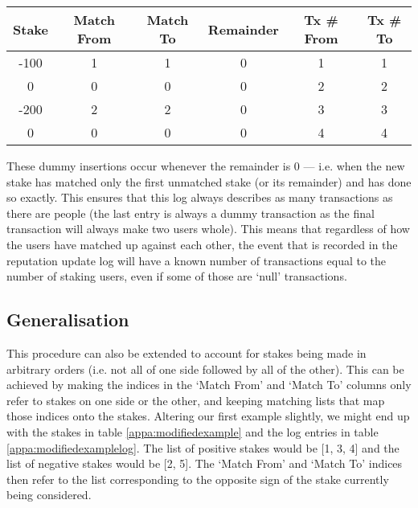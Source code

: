 \begin{table}[ht]
\centering
\caption{}
\begin{tabular}{|c|c|c|c|c|c|}
\hline
Stake & Match From & Match To & Remainder & Tx \# From & Tx \# To \\ \hline
-100  & 1          & 1        & 0   & 1 & 1     \\ \hline
 0 & 0          & 0        & 0      & 2 & 2   \\ \hline
-200 & 2          & 2        & 0    & 3 & 3    \\ \hline
 0 & 0          & 0        & 0      & 4 & 4   \\ \hline
\end{tabular}
\end{table}

These dummy insertions occur whenever the remainder is 0 --- i.e. when the new stake has matched only the first unmatched stake (or its remainder) and has done so exactly. This ensures that this log always describes as many transactions as there are people (the last entry is always a dummy transaction as the final transaction will always make two users whole). This means that regardless of how the users have matched up against each other, the event that is recorded in the reputation update log will have a known number of transactions equal to the number of staking users, even if some of those are `null' transactions.

\subsection{Generalisation}

This procedure can also be extended to account for stakes being made in arbitrary orders (i.e. not all of one side followed by all of the other). This can be achieved by making the indices in the `Match From' and `Match To' columns only refer to stakes on one side or the other, and keeping matching lists that map those indices onto the stakes. Altering our first example slightly, we might end up with the stakes in table \ref{appa:modifiedexample} and the log entries in table \ref{appa:modifiedexamplelog}. The list of positive stakes would be [1, 3, 4] and the list of negative stakes would be [2, 5]. The `Match From' and `Match To' indices then refer to the list corresponding to the opposite sign of the stake currently being considered.

